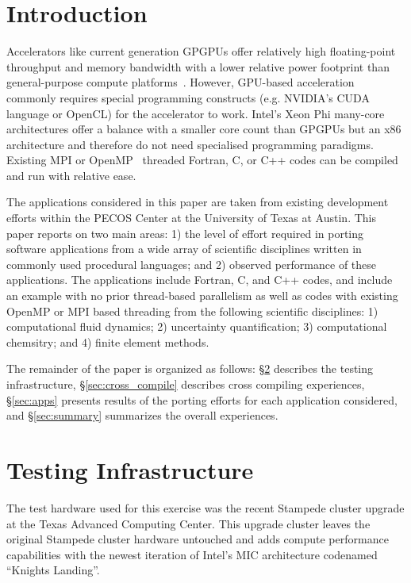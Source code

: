 \section{Introduction}
\label{sec:intro}

Accelerators like current generation GPGPUs offer relatively high
floating-point throughput and memory bandwidth with a lower relative power
footprint than general-purpose compute platforms~\cite{gpu_hpc:2009}. However,
GPU-based acceleration commonly requires special programming constructs (e.g.
NVIDIA's CUDA language\cite{} or OpenCL\cite{}) for the accelerator to work.
Intel's Xeon Phi many-core architectures offer a balance with a smaller core count than GPGPUs
but an x86 architecture and therefore do not need specialised programming
paradigms.  Existing MPI or OpenMP~\cite{openmp_standard} threaded Fortran, C,
or C++ codes can be compiled and run with relative ease.

The applications considered in this paper are taken from existing development
efforts within the PECOS Center\cite{} at the University of Texas at Austin.  This
paper reports on two main areas: 1) the level of effort required in porting
software applications from a wide array of scientific disciplines written in
commonly used procedural languages; and 2) observed performance of these
applications.  The applications include Fortran, C, and C++ codes, and include
an example with no prior thread-based parallelism as well as codes with
existing OpenMP or MPI based threading from the following scientific
disciplines: 1) computational fluid dynamics; 2) uncertainty quantification;
3) computational chemsitry; and 4) finite element methods.

The remainder of the paper is organized as follows: \S\ref{sec:hardware}
describes the testing infrastructure, \S\ref{sec:cross_compile} describes cross
compiling experiences, \S\ref{sec:apps} presents results of the porting efforts
for each application considered, and \S\ref{sec:summary} summarizes the overall
experiences.

\section{Testing Infrastructure}
\label{sec:hardware}

The test hardware used for this exercise was the recent Stampede cluster
upgrade at the Texas Advanced Computing Center.  This upgrade cluster leaves
the original Stampede cluster hardware untouched and adds compute performance
capabilities with the newest iteration of Intel's MIC architecture codenamed
``Knights Landing''.

